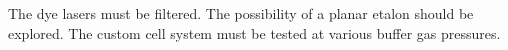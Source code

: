 The dye lasers must be filtered. The possibility of a planar etalon should be explored. The custom cell system must be tested at various buffer gas pressures.

